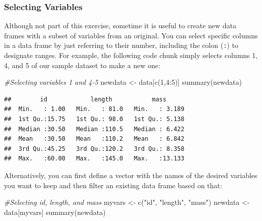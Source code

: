 \documentclass[
]{book}
\newenvironment{Shaded}{\begin{snugshade}}{\end{snugshade}}
\newcommand{\CommentTok}[1]{\textcolor[rgb]{0.56,0.35,0.01}{\textit{#1}}}
\newcommand{\DecValTok}[1]{\textcolor[rgb]{0.00,0.00,0.81}{#1}}
\newcommand{\FunctionTok}[1]{\textcolor[rgb]{0.00,0.00,0.00}{#1}}
\newcommand{\NormalTok}[1]{#1}
\newcommand{\OtherTok}[1]{\textcolor[rgb]{0.56,0.35,0.01}{#1}}
\newcommand{\SpecialCharTok}[1]{\textcolor[rgb]{0.00,0.00,0.00}{#1}}
\newcommand{\StringTok}[1]{\textcolor[rgb]{0.31,0.60,0.02}{#1}}
\begin{document}
\hypertarget{selecting-variables}{%
\subsubsection*{Selecting Variables}\label{selecting-variables}}

Although not part of this exercise, sometime it is useful to create new data frames with a subset of variables from an original. You can select specific columns in a data frame by just referring to their number, including the colon (\texttt{:}) to designate ranges. For example, the following code chunk simply selects columns 1, 4, and 5 of our sample dataset to make a new one:

\begin{Shaded}
\begin{Highlighting}[]
\CommentTok{\#Selecting variables 1 and 4{-}5}
\NormalTok{newdata }\OtherTok{\textless{}{-}}\NormalTok{ data[}\FunctionTok{c}\NormalTok{(}\DecValTok{1}\NormalTok{,}\DecValTok{4}\SpecialCharTok{:}\DecValTok{5}\NormalTok{)]}
\FunctionTok{summary}\NormalTok{(newdata)}
\end{Highlighting}
\end{Shaded}

\begin{verbatim}
##        id            length           mass       
##  Min.   : 1.00   Min.   : 81.0   Min.   : 3.189  
##  1st Qu.:15.75   1st Qu.: 98.0   1st Qu.: 5.138  
##  Median :30.50   Median :110.5   Median : 6.422  
##  Mean   :30.50   Mean   :110.2   Mean   : 6.842  
##  3rd Qu.:45.25   3rd Qu.:120.2   3rd Qu.: 8.358  
##  Max.   :60.00   Max.   :145.0   Max.   :13.133
\end{verbatim}

Alternatively, you can first define a vector with the names of the desired variables you want to keep and then filter an existing data frame based on that:

\begin{Shaded}
\begin{Highlighting}[]
\CommentTok{\#Selecting id, length, and mass}
\NormalTok{myvars }\OtherTok{\textless{}{-}} \FunctionTok{c}\NormalTok{(}\StringTok{"id"}\NormalTok{, }\StringTok{"length"}\NormalTok{, }\StringTok{"mass"}\NormalTok{)}
\NormalTok{newdata }\OtherTok{\textless{}{-}}\NormalTok{ data[myvars]}
\FunctionTok{summary}\NormalTok{(newdata)}
\end{Highlighting}
\end{Shaded}
\end{document}
